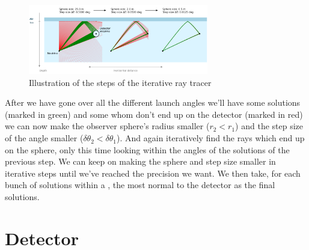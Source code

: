 \documentclass[11pt,a4paper,faculty=we,language=en,doctype=report]{cls/ugent-doc}
\begin{document}
\begin{figure}
  \centering
  \includegraphics[width=0.7\textwidth]{IterativeWorkings.png}
  \caption{Illustration of the steps of the iterative ray tracer}
  \label{fig:IterativeWorkings}
\end{figure}
After we have gone over all the different launch angles we'll have some
solutions (marked in green) and some whom don't end up on the detector (marked
in red) we can now make the observer sphere's radius smaller ($r_2 < r_1$) and
the step size of the angle smaller ($\delta \theta_2 < \delta \theta_1$).  And
again iteratively find the rays which end up on the sphere, only this time
looking within the angles of the solutions of the previous step. We can keep on
making the sphere and step size smaller in iterative steps until we've reached
the precision we want. We then take, for each bunch of solutions within a , the most normal to
the detector as the final solutions.

\chapter{Detector}
\end{document}
